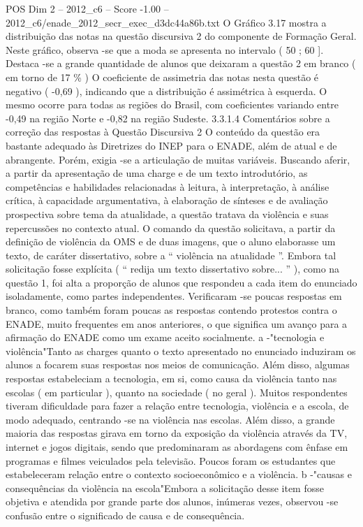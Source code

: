 \begin{textsample}{POS Dim 2 – 2012\_c6 – Score -1.00 – 2012\_c6/enade\_2012\_secr\_exec\_d3dc44a86b.txt}
O Gráfico 3.17 mostra a distribuição das notas na questão discursiva 2 do componente de Formação Geral.
Neste gráfico, observa -se que a moda se apresenta no intervalo ( 50 ; 60 ].
Destaca -se a grande quantidade de alunos que deixaram a questão 2 em branco ( em torno de 17 \% ) O coeficiente de assimetria das notas nesta questão é negativo ( -0,69 ), indicando que a distribuição é assimétrica à esquerda.
O mesmo ocorre para todas as regiões do Brasil, com coeficientes variando entre -0,49 na região Norte e -0,82 na região Sudeste. 3.3.1.4 Comentários sobre a correção das respostas à Questão Discursiva 2 O conteúdo da questão era bastante adequado às Diretrizes do INEP para o ENADE, além de atual e de abrangente.
Porém, exigia -se a articulação de muitas variáveis.
Buscando aferir, a partir da apresentação de uma charge e de um texto introdutório, as competências e habilidades relacionadas à leitura, à interpretação, à análise crítica, à capacidade argumentativa, à elaboração de sínteses e de avaliação prospectiva sobre tema da atualidade, a questão tratava da violência e suas repercussões no contexto atual.
O comando da questão solicitava, a partir da definição de violência da OMS e de duas imagens, que o aluno elaborasse um texto, de caráter dissertativo, sobre a “ violência na atualidade ”.
Embora tal solicitação fosse explícita ( “ redija um texto dissertativo sobre... ” ), como na questão 1, foi alta a proporção de alunos que respondeu a cada item do enunciado isoladamente, como partes independentes.
Verificaram -se poucas respostas em branco, como também foram poucas as respostas contendo protestos contra o ENADE, muito frequentes em anos anteriores, o que significa um avanço para a afirmação do ENADE como um exame aceito socialmente. a -"tecnologia e violência"Tanto as charges quanto o texto apresentado no enunciado induziram os alunos a focarem suas respostas nos meios de comunicação.
Além disso, algumas respostas estabeleciam a tecnologia, em si, como causa da violência tanto nas escolas ( em particular ), quanto na sociedade ( no geral ).
Muitos respondentes tiveram dificuldade para fazer a relação entre tecnologia, violência e a escola, de modo adequado, centrando -se na violência nas escolas.
Além disso, a grande maioria das respostas girava em torno da exposição da violência através da TV, internet e jogos digitais, sendo que predominaram as abordagens com ênfase em programas e filmes veiculados pela televisão.
Poucos foram os estudantes que estabeleceram relação entre o contexto socioeconômico e a violência. b -"causas e consequências da violência na escola"Embora a solicitação desse item fosse objetiva e atendida por grande parte dos alunos, inúmeras vezes, observou -se confusão entre o significado de causa e de consequência.

\end{textsample}
